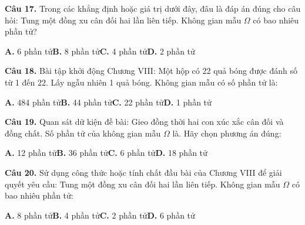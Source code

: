 \documentclass[11pt,a4paper]{article}
\begin{document}
\textbf{\color{primary} Câu 17.} Trong các khẳng định hoặc giá trị dưới đây, đâu là đáp án đúng cho câu hỏi: Tung một đồng xu cân đối hai lần liên tiếp. Không gian mẫu $\Omega$ có bao nhiêu phần tử?\par
\hspace*{1.5em}\textbf{A.} 6 phần tử\quad\quad \textbf{B.} 8 phần tử\quad\quad \textbf{C.} 4 phần tử\quad\quad \textbf{D.} 2 phần tử\par\vspace{2pt}
\textbf{\color{primary} Câu 18.} Bài tập khởi động Chương VIII: Một hộp có 22 quả bóng được đánh số từ 1 đến 22. Lấy ngẫu nhiên 1 quả bóng. Không gian mẫu có số phần tử là:\par
\hspace*{1.5em}\textbf{A.} 484 phần tử\quad\quad \textbf{B.} 44 phần tử\quad\quad \textbf{C.} 22 phần tử\quad\quad \textbf{D.} 1 phần tử\par\vspace{2pt}
\textbf{\color{primary} Câu 19.} Quan sát dữ kiện đề bài: Gieo đồng thời hai con xúc xắc cân đối và đồng chất. Số phần tử của không gian mẫu $\Omega$ là. Hãy chọn phương án đúng:\par
\hspace*{1.5em}\textbf{A.} 12 phần tử\quad\quad \textbf{B.} 36 phần tử\quad\quad \textbf{C.} 6 phần tử\quad\quad \textbf{D.} 18 phần tử\par\vspace{2pt}
\textbf{\color{primary} Câu 20.} Sử dụng công thức hoặc tính chất đầu bài của Chương VIII để giải quyết yêu cầu: Tung một đồng xu cân đối hai lần liên tiếp. Không gian mẫu $\Omega$ có bao nhiêu phần tử:\par
\hspace*{1.5em}\textbf{A.} 8 phần tử\quad\quad \textbf{B.} 4 phần tử\quad\quad \textbf{C.} 2 phần tử\quad\quad \textbf{D.} 6 phần tử\par\vspace{2pt}
\end{document}
